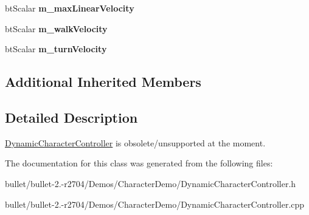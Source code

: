 \begin{DoxyCompactItemize}
\item 
\hypertarget{class_dynamic_character_controller_a10ce580feebdd36ffd3d434a4fa779ec}{bt\+Scalar {\bfseries m\+\_\+max\+Linear\+Velocity}}\label{class_dynamic_character_controller_a10ce580feebdd36ffd3d434a4fa779ec}

\item 
\hypertarget{class_dynamic_character_controller_a8502f61233b9690a6457b6b665a5e42a}{bt\+Scalar {\bfseries m\+\_\+walk\+Velocity}}\label{class_dynamic_character_controller_a8502f61233b9690a6457b6b665a5e42a}

\item 
\hypertarget{class_dynamic_character_controller_aecea5eb133476351295993857a182d1b}{bt\+Scalar {\bfseries m\+\_\+turn\+Velocity}}\label{class_dynamic_character_controller_aecea5eb133476351295993857a182d1b}

\end{DoxyCompactItemize}
\subsection*{Additional Inherited Members}


\subsection{Detailed Description}
\hyperlink{class_dynamic_character_controller}{Dynamic\+Character\+Controller} is obsolete/unsupported at the moment. 

The documentation for this class was generated from the following files\+:\begin{DoxyCompactItemize}
\item 
bullet/bullet-\/2.-\/r2704/\+Demos/\+Character\+Demo/Dynamic\+Character\+Controller.\+h\item 
bullet/bullet-\/2.-\/r2704/\+Demos/\+Character\+Demo/Dynamic\+Character\+Controller.\+cpp\end{DoxyCompactItemize}
